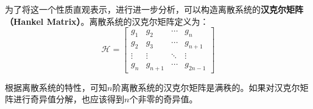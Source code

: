 为了将这一个性质直观表示，进行进一步分析，可以构造离散系统的\textbf{汉克尔矩阵（Hankel Matrix）}。离散系统的汉克尔矩阵定义为：
\begin{equation}
    \bm{\mathcal{H}} =
    \begin{bmatrix}
        g_{1} & g_{2} & \cdots & g_{n} \\
        g_{2} & g_{3} & \cdots & g_{n+1} \\
        \vdots & \vdots & \ddots & \vdots \\
        g_{n} & g_{n+1} & \cdots & g_{2n-1}
    \end{bmatrix}
    \label{eq:汉克尔矩阵}
\end{equation}

根据离散系统的特性，可知\(n\)阶离散系统的汉克尔矩阵是满秩的。如果对汉克尔矩阵进行奇异值分解，也应该得到\(n\)个非零的奇异值。
